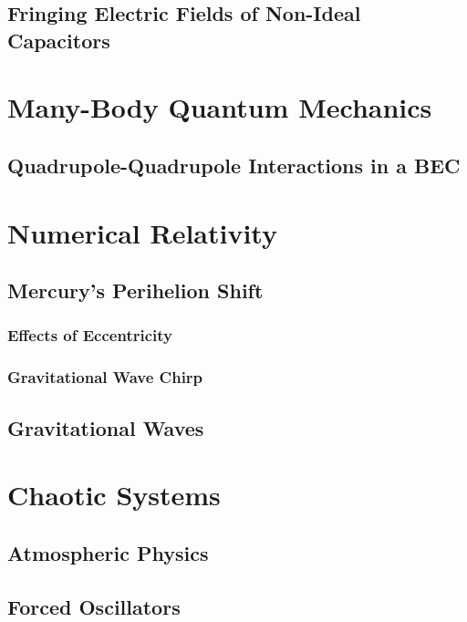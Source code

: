 \documentclass{report}
\begin{document}
        \subsection{Fringing Electric Fields of Non-Ideal Capacitors}

    \section{Many-Body Quantum Mechanics}

        \subsection{Quadrupole-Quadrupole Interactions in a BEC}

    \section{Numerical Relativity}

        \subsection{Mercury's Perihelion Shift}

            \subsubsection{Effects of Eccentricity}

            \subsubsection{Gravitational Wave Chirp}

        \subsection{Gravitational Waves}

    \section{Chaotic Systems}

        \subsection{Atmospheric Physics}

        \subsection{Forced Oscillators}
\end{document}
